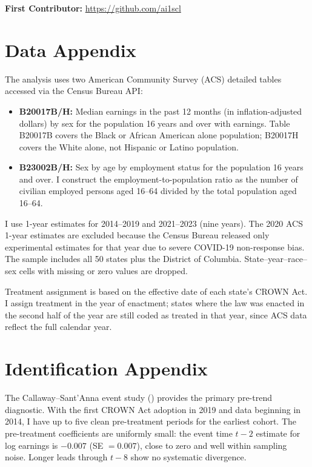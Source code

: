 \documentclass[12pt]{article}
\begin{document}
\noindent\textbf{First Contributor:} \url{https://github.com/ai1scl}

\label{apep_main_text_end}
\newpage



\newpage
\appendix

\section{Data Appendix}
\label{app:data}

The analysis uses two American Community Survey (ACS) detailed tables accessed via the Census Bureau API:

\begin{itemize}
\item \textbf{B20017B/H:} Median earnings in the past 12 months (in inflation-adjusted dollars) by sex for the population 16 years and over with earnings. Table B20017B covers the Black or African American alone population; B20017H covers the White alone, not Hispanic or Latino population.
\item \textbf{B23002B/H:} Sex by age by employment status for the population 16 years and over. I construct the employment-to-population ratio as the number of civilian employed persons aged 16--64 divided by the total population aged 16--64.
\end{itemize}

I use 1-year estimates for 2014--2019 and 2021--2023 (nine years). The 2020 ACS 1-year estimates are excluded because the Census Bureau released only experimental estimates for that year due to severe COVID-19 non-response bias. The sample includes all 50 states plus the District of Columbia. State--year--race--sex cells with missing or zero values are dropped.

Treatment assignment is based on the effective date of each state's CROWN Act. I assign treatment in the year of enactment; states where the law was enacted in the second half of the year are still coded as treated in that year, since ACS data reflect the full calendar year.

\section{Identification Appendix}
\label{app:id}

The Callaway--Sant'Anna event study () provides the primary pre-trend diagnostic. With the first CROWN Act adoption in 2019 and data beginning in 2014, I have up to five clean pre-treatment periods for the earliest cohort. The pre-treatment coefficients are uniformly small: the event time $t-2$ estimate for log earnings is $-0.007$ (SE $= 0.007$), close to zero and well within sampling noise. Longer leads through $t-8$ show no systematic divergence.
\end{document}
